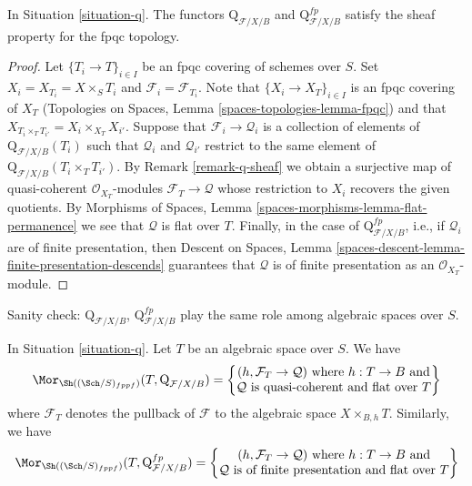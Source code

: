\begin{lemma}
\label{lemma-q-sheaf}
In Situation \ref{situation-q}. The functors
$\text{Q}_{\mathcal{F}/X/B}$ and
$\text{Q}^{fp}_{\mathcal{F}/X/B}$
satisfy the sheaf property for the fpqc topology.
\end{lemma}

\begin{proof}
Let $\{T_i \to T\}_{i \in I}$ be an fpqc covering of schemes over $S$.
Set $X_i = X_{T_i} = X \times_S T_i$ and $\mathcal{F}_i = \mathcal{F}_{T_i}$.
Note that $\{X_i \to X_T\}_{i \in I}$ is an fpqc covering of
$X_T$ (Topologies on Spaces, Lemma \ref{spaces-topologies-lemma-fpqc})
and that $X_{T_i \times_T T_{i'}} = X_i \times_{X_T} X_{i'}$.
Suppose that $\mathcal{F}_i \to \mathcal{Q}_i$ is a collection of
elements of $\text{Q}_{\mathcal{F}/X/B}(T_i)$ such that $\mathcal{Q}_i$
and $\mathcal{Q}_{i'}$ restrict to the same element of
$\text{Q}_{\mathcal{F}/X/B}(T_i \times_T T_{i'})$. By
Remark \ref{remark-q-sheaf}
we obtain a surjective map of quasi-coherent $\mathcal{O}_{X_T}$-modules
$\mathcal{F}_T \to \mathcal{Q}$ whose restriction to $X_i$ recovers
the given quotients.
By Morphisms of Spaces, Lemma \ref{spaces-morphisms-lemma-flat-permanence}
we see that $\mathcal{Q}$ is flat over $T$. Finally, in the case of
$\text{Q}^{fp}_{\mathcal{F}/X/B}$, i.e., if $\mathcal{Q}_i$ are
of finite presentation, then
Descent on Spaces, Lemma
\ref{spaces-descent-lemma-finite-presentation-descends}
guarantees that $\mathcal{Q}$ is of finite presentation as an
$\mathcal{O}_{X_T}$-module.
\end{proof}

\noindent
Sanity check: $\text{Q}_{\mathcal{F}/X/B}$,
$\text{Q}^{fp}_{\mathcal{F}/X/B}$
play the same role among algebraic spaces
over $S$.

\begin{lemma}
\label{lemma-extend-q-to-spaces}
In Situation \ref{situation-q}. Let $T$ be an algebraic space over $S$.
We have
$$
\Mor_{\Sh((\Sch/S)_{fppf})}(T,  \text{Q}_{\mathcal{F}/X/B}) =
\left\{
\begin{matrix}
(h, \mathcal{F}_T \to \mathcal{Q}) \text{ where }
h : T \to B \text{ and}\\
\mathcal{Q}\text{ is quasi-coherent and flat over }T
\end{matrix}
\right\}
$$
where $\mathcal{F}_T$ denotes the pullback of $\mathcal{F}$
to the algebraic space $X \times_{B, h} T$. Similarly, we have
$$
\Mor_{\Sh((\Sch/S)_{fppf})}(T,  \text{Q}^{fp}_{\mathcal{F}/X/B}) =
\left\{
\begin{matrix}
(h, \mathcal{F}_T \to \mathcal{Q}) \text{ where }
h : T \to B \text{ and}\\
\mathcal{Q}\text{ is of finite presentation and flat over }T
\end{matrix}
\right\}
$$
\end{lemma}

